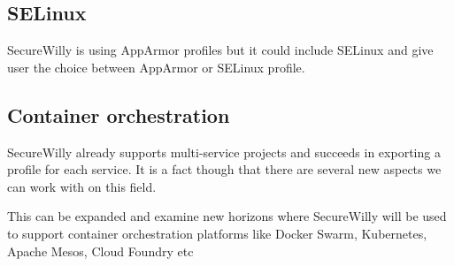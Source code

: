 \subsection{SELinux}
SecureWilly is using AppArmor profiles but it could include SELinux and give user the choice between AppArmor or SELinux profile.

\subsection{Container orchestration}
SecureWilly already supports multi-service projects and succeeds in exporting a profile for each service. It is a fact though that there are several new aspects we can work with on this field.

This can be expanded and examine new horizons where SecureWilly will be used to support container orchestration platforms like Docker Swarm, Kubernetes, Apache Mesos, Cloud Foundry etc 

